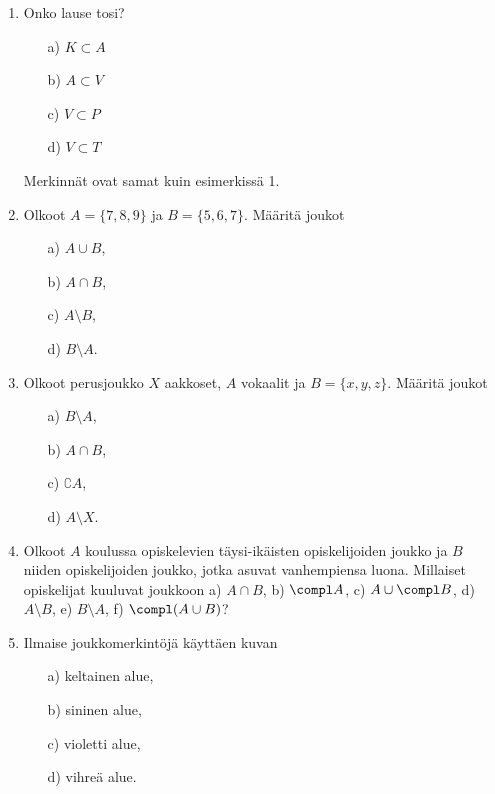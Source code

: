 


\Harjoitustehtavat

\begin{enumerate}

\item Onko lause tosi?
\begin{itemize}
\item[a)] $K \subset A$
\item[b)] $A \subset V$
\item[c)] $V \subset P$
\item[d)] $V \subset T$
\end{itemize}
Merkinnät ovat samat kuin esimerkissä 1.

\item Olkoot $A = \{7,8,9\}$ ja $B=\{5,6,7\}$. Määritä joukot
\begin{itemize}
\item[a)] $A \cup B$,
\item[b)] $A \cap B$,
\item[c)] $A \setminus B$,
\item[d)] $B \setminus A$.
\end{itemize}

\item Olkoot perusjoukko $X$ aakkoset, $A$ vokaalit ja $B=\{x,y,z\}$.
Määritä joukot
\begin{itemize}
\item[a)] $B\setminus A$,
\item[b)] $A\cap B$,
\item[c)] $\complement A$,
\item[d)] $A \setminus X$.
\end{itemize}


\item
Olkoot $A$ koulussa opiskelevien täysi-ikäisten opiskelijoiden joukko ja $B$ niiden opiskelijoiden joukko, jotka asuvat vanhempiensa luona. Millaiset opiskelijat kuuluvat joukkoon a) $A \cap B$,  b) $\compl A$, c) $A \cup \compl B$, d) $A\setminus B$, e) $B \setminus A$, f) $\compl (A \cup B)$?

\item
Ilmaise joukkomerkintöjä käyttäen kuvan
\begin{itemize}
\item[a)] keltainen alue,
\item[b)] sininen alue,
\item[c)] violetti alue,
\item[d)] vihreä alue.
\end{itemize}


\end{enumerate}
